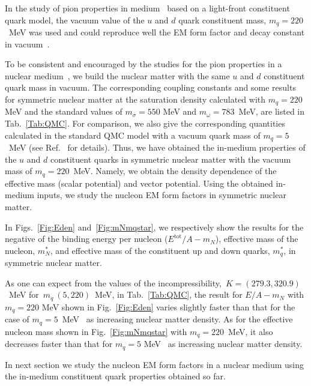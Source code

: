 \documentclass[preprint,aps,showpacs,floatfix]{revtex4}
\begin{document}
In the study of pion properties in medium~\cite{pimedium1,pimedium2,pimedium3,pimedium4} 
based on a light-front constituent quark model, the vacuum value of the $u$ and $d$ quark 
constituent mass, $m_q = 220$~MeV was used and could reproduce well 
the EM form factor and decay constant in vacuum~\cite{Pacheco1}.



To be consistent and encouraged by the studies for the pion properties 
in a nuclear medium~\cite{pimedium1,pimedium2,pimedium3,pimedium4}, 
we build the nuclear matter with the same $u$ and $d$ constituent quark mass in vacuum. 
The corresponding coupling constants and some results for symmetric nuclear matter 
at the saturation density calculated with $m_q = 220$ MeV and the standard values of 
$m_{\sigma}=550$ MeV and $m_{\omega}=783$~MeV, are listed in Tab.~\ref{Tab:QMC}.
For comparison, we also give the corresponding quantities calculated in the standard QMC
model with a vacuum quark mass of $m_q = 5$~MeV (see Ref.~\cite{QMCreview} for details).
Thus, we have obtained the in-medium properties of the $u$ and $d$ constituent quarks in symmetric
nuclear matter with the vacuum mass of $m_q = 220$~MeV. Namely, we obtain 
the density dependence of the effective mass (scalar potential) and vector potential.
Using the obtained in-medium inputs, we study the nucleon 
EM form factors in symmetric nuclear matter.

In Figs.~\ref{Fig:Eden} and~\ref{Fig:mNmqstar}, we respectively show the results for
the negative of the binding energy per nucleon ($E^\mathrm{tot}/A - m_N$),
effective mass of the nucleon, $m_N^*$,
and effective mass of the constituent up and down quarks, 
$m_q^*$, in symmetric nuclear matter.

As one can expect from the values of the incompressibility,~$K = (279.3, 320.9)$~MeV 
for~$m_q~(5,220)$~MeV, in Tab.~\ref{Tab:QMC}, 
the result for $E/A - m_N$ with $m_q = 220$ MeV shown in Fig.~\ref{Fig:Eden} varies slightly 
faster than that for the case of $m_q = 5$~MeV~\cite{QMCreview} as increasing nuclear matter density. 
As for the effective nucleon mass shown in Fig.~\ref{Fig:mNmqstar} with $m_q = 220$~MeV, 
it also decreases faster than that for $m_q = 5$ MeV~\cite{QMCreview}   
as increasing nuclear matter density.

In next section we study the nucleon EM form factors 
in a nuclear medium using the in-medium constituent quark properties 
obtained so far.

\end{document}

